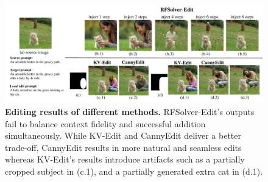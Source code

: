 \documentclass{article}
\begin{document}
\begin{figure}[t]

    \centering
    \includegraphics[width=0.9\linewidth]{figures/cat3.pdf}
      \caption{\textbf{Editing results of different methods.} RFSolver-Edit's outputs fail to balance context fidelity and successful addition simultaneously. While KV-Edit and CannyEdit deliver a better trade-off, CannyEdit results in more natural and seamless edits whereas KV-Edit's results introduce artifacts such as a {partially cropped subject} in (c.1), and {a partially generated extra cat} in (d.1).}
    \label{fig2}
\end{figure}
\end{document}
